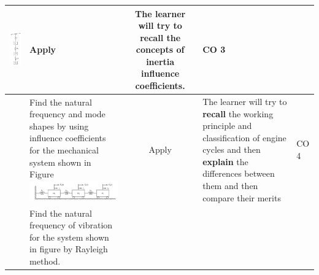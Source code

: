 \documentclass[11pt,paper=a4,answers]{exam}
\begin{document}
\begin{flushleft}
\begin{longtable}{|>{\centering\arraybackslash}p{0.8cm}  | >{\raggedright\arraybackslash}p{6.5cm}  | c | >{\raggedright\arraybackslash}p{5cm} |>{\centering\arraybackslash}p{1cm}|}
\includegraphics[scale=0.2]{6_10.png}
&	Apply&	The learner will try to \textbf{recall} the concepts of inertia influence coefficients.&	CO 3\\
	\hline
	5&	Find the natural frequency and mode shapes by using influence coefficients for the mechanical system shown in Figure 
\includegraphics[scale=0.45]{18.jpg}
&	Apply&	The learner will try to \textbf{recall} the working principle and classification of engine cycles and then \textbf{explain} the differences between them and then compare their merits&	CO 4\\
	\hline
6&	Find the natural frequency of vibration for the system shown in figure by Rayleigh method.


\end{longtable}
\end{flushleft}
\end{document}
